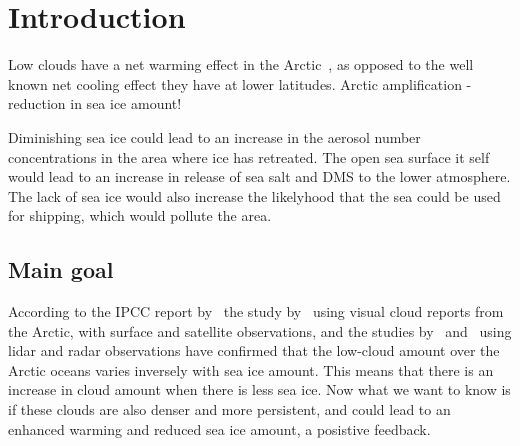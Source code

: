 \chapter{Introduction}
\label{chap:introduction}
Low clouds have a net warming effect in the Arctic~\citep{Intrieri2002a}, as opposed to the well known net cooling effect they have at lower latitudes.
Arctic amplification - reduction in sea ice amount!

 
Diminishing sea ice could lead to an increase in the aerosol number concentrations in the area where ice has retreated. The open sea surface it self would lead to an increase in release of sea salt and DMS to the lower atmosphere. The lack of sea ice would also increase the likelyhood that the sea could be used for shipping, which would pollute the area.


\section{Main goal}
According to the IPCC report by~\citet{Boucher2013} the study by~\citet{Eastman2010b} using visual cloud reports from the Arctic, with surface and satellite observations, and the studies by~\citet{Kay2009} and~\citet{Palm2010} using lidar and radar observations have confirmed that the low-cloud amount over the Arctic oceans varies inversely with sea ice amount. This means that there is an increase in cloud amount when there is less sea ice. Now what we want to know is if these clouds are also denser and more persistent, and could lead to an enhanced warming and reduced sea ice amount, a posistive feedback.

